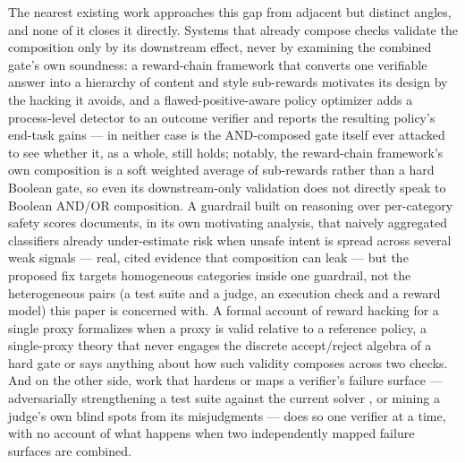 \documentclass[11pt]{article}
\begin{document}
The nearest existing work approaches this gap from adjacent but distinct angles, and none of it closes it directly. Systems that already compose checks validate the composition only by its downstream effect, never by examining the combined gate's own soundness: a reward-chain framework that converts one verifiable answer into a hierarchy of content and style sub-rewards \citep{rewardchain2601} motivates its design by the hacking it avoids, and a flawed-positive-aware policy optimizer adds a process-level detector to an outcome verifier \citep{fapo2510} and reports the resulting policy's end-task gains --- in neither case is the AND-composed gate itself ever attacked to see whether it, as a whole, still holds; notably, the reward-chain framework's own composition is a soft weighted average of sub-rewards rather than a hard Boolean gate, so even its downstream-only validation does not directly speak to Boolean AND/OR composition. A guardrail built on reasoning over per-category safety scores \citep{r2guard2407} documents, in its own motivating analysis, that naively aggregated classifiers already under-estimate risk when unsafe intent is spread across several weak signals --- real, cited evidence that composition can leak --- but the proposed fix targets homogeneous categories inside one guardrail, not the heterogeneous pairs (a test suite and a judge, an execution check and a reward model) this paper is concerned with. A formal account of reward hacking for a single proxy \citep{correlatedproxies2403} formalizes when a proxy is valid relative to a reference policy, a single-proxy theory that never engages the discrete accept/reject algebra of a hard gate or says anything about how such validity composes across two checks. And on the other side, work that hardens or maps a verifier's failure surface --- adversarially strengthening a test suite against the current solver \citep{utrl2508}, or mining a judge's own blind spots from its misjudgments \citep{biasscope2602} --- does so one verifier at a time, with no account of what happens when two independently mapped failure surfaces are combined.
\end{document}
